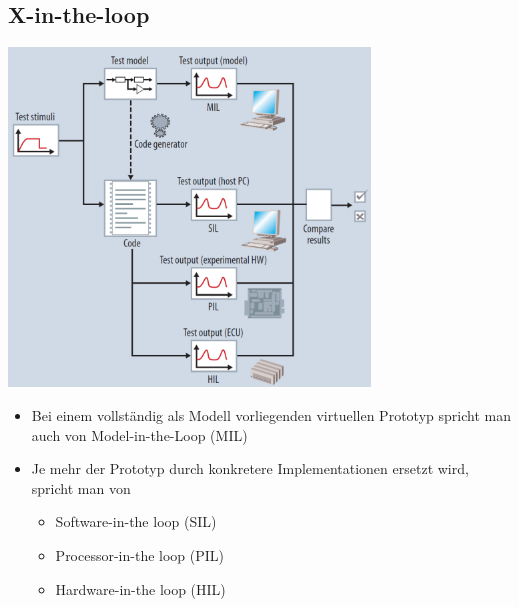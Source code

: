 \subsection{X-in-the-loop}
	\begin{multicols}{2}	
		\includegraphics[height=9cm]{images/HWSWCodesign/X-in-the-loop}
		\columnbreak
		\begin{itemize}
			\item Bei einem vollständig als Modell vorliegenden virtuellen Prototyp spricht man auch von Model-in-the-Loop (MIL)				
			\item Je mehr der Prototyp durch konkretere Implementationen ersetzt wird, spricht man von
			\begin{itemize}	
				\item Software-in-the loop (SIL)
				\item Processor-in-the loop (PIL)
				\item Hardware-in-the loop (HIL)
			\end{itemize}
		\end{itemize}
	\end{multicols} 
	
	
